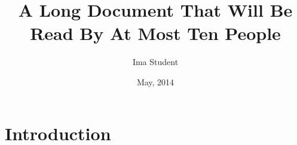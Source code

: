 \documentclass[]{cwru} %
\title{A Long Document That Will Be Read By At Most Ten People}
\author{Ima Student}
\date{May, 2014} %
\begin{document}
% 

\maketitle
\makeapprovalsheet

\frontmatter
\tableofcontents

\cleardoublepage
{}
{}
\listoftables

\cleardoublepage
{}
{}
\listoffigures

\begin{acknowledgements}
\lipsum[1-3]
\end{acknowledgements}




\begin{abstract}
\lipsum[1-1]
\end{abstract}

\mainmatter
\chapter{Introduction}
\lipsum[1-10]

\backmatter
\appendix

%
%
\end{document}
